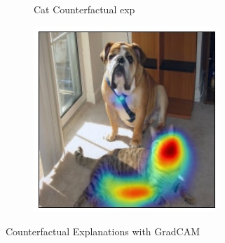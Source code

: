 \begin{figure}[ht!]
\begin{subfigure}[t]{0.158\textwidth}
        \caption{\scriptsize{Cat Counterfactual exp}}
		\label{fig:neg_exp_cat}
	\end{subfigure}
    \centering
	\begin{subfigure}[t]{0.158\textwidth}
        \centering
        \includegraphics[width=\textwidth]{figures/dog_neg_exp.jpg}
        \caption{}%
		\label{fig:neg_exp_dog}
	\end{subfigure}
    \vspace{10pt}
    \caption{Counterfactual Explanations with GradCAM}
    \label{fig:negexp}
\end{figure}






